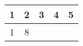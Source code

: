 \documentclass{jsarticle}
\begin{document}
\begin{table}
  \centering
  \begin{tabular}{ccccc}
    1 & 2 & 3 & 4 & 5\\ \hline
    1 & 8 & & &\\
  \end{tabular}
\end{table}
\end{document}
